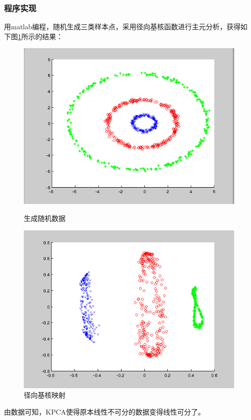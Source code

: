 \documentclass[10pt,a4paper]{article}
\begin{document}
\begin{CJK*}{UTF8}{song}
\subsubsection{程序实现}
用matlab编程，随机生成三类样本点，采用径向基核函数进行主元分析，获得如下图\ref{kpca}所示的结果：
\begin{figure}[!htbp]
  \begin{minipage}[t]{0.48\linewidth}
    \centering
    \includegraphics[width=\textwidth]{figs/kpca_pre.png}
    \caption{生成随机数据\label{kpca_pre}}
  \end{minipage}
  \hfill
  \begin{minipage}[t]{0.48\linewidth}
    \centering
    \includegraphics[width=\textwidth]{figs/kpca_deal.png}
    \caption{径向基核映射\label{kpca_deal}}
  \end{minipage}
  \label{kpca}
\end{figure}
由数据可知，KPCA使得原本线性不可分的数据变得线性可分了。



\end{CJK*}
\end{document}
